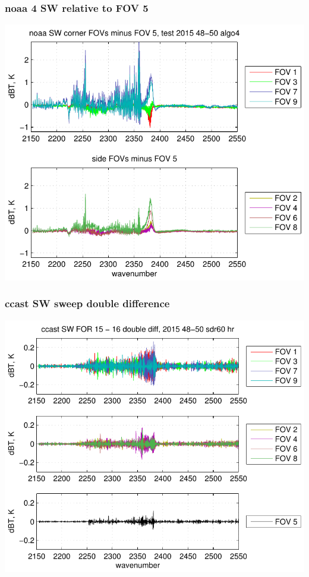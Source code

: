 \documentclass[11pt]{beamer}
\begin{document}
\begin{frame}
\frametitle{noaa 4 SW relative to FOV 5}
\begin{center}
  \includegraphics[scale=0.7]{figures/noaa_SW_dif_2015_48-50_algo4.pdf}
\end{center}
\end{frame}
\begin{frame}
\frametitle{ccast SW sweep double difference}
\begin{center}
  \includegraphics[scale=0.7]{figures/ccast_SW_sfil_2015_48-50_sdr60_hr.pdf}
\end{center}
\end{frame}
\end{document}
